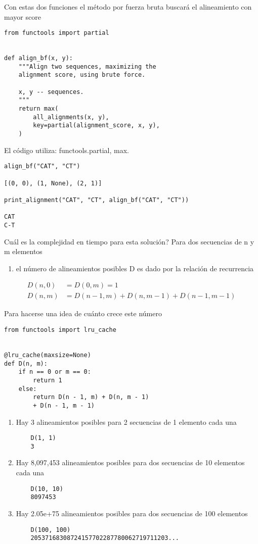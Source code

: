 \documentclass[usenatbib]{tjaa}
\begin{document}
Con estas dos funciones el método por fuerza bruta buscará el alineamiento con mayor score 

\begin{verbatim}
from functools import partial


def align_bf(x, y):
    """Align two sequences, maximizing the
    alignment score, using brute force.

    x, y -- sequences.
    """
    return max(
        all_alignments(x, y),
        key=partial(alignment_score, x, y),
    )
\end{verbatim}

El código utiliza: functools.partial, max.

\begin{verbatim}
align_bf("CAT", "CT")

[(0, 0), (1, None), (2, 1)]

print_alignment("CAT", "CT", align_bf("CAT", "CT"))

CAT
C-T
\end{verbatim}

Cuál es la complejidad en tiempo para esta solución? Para dos secuencias de n y m elementos

\begin{enumerate}
    \item el número de alineamientos posibles D es dado por la relación de recurrencia
\end{enumerate}

\begin{align*}
    D(n,0) &= D(0,m) = 1\\
    D(n,m) &= D(n-1,m)+D(n,m-1)+D(n-1,m-1)
\end{align*}

Para hacerse una idea de cuánto crece este número

\begin{verbatim}
from functools import lru_cache


@lru_cache(maxsize=None)
def D(n, m):
    if n == 0 or m == 0:
        return 1
    else:
        return D(n - 1, m) + D(n, m - 1) 
        + D(n - 1, m - 1)
\end{verbatim}

\begin{enumerate}
    \item Hay 3 alineamientos posibles para 2 secuencias de 1 elemento cada una \begin{verbatim}
    D(1, 1)
    3
    \end{verbatim}
    \item Hay 8,097,453 alineamientos posibles para dos secuencias de 10 elementos cada una \begin{verbatim}
    D(10, 10)
    8097453
    \end{verbatim}
    \item Hay 2.05e+75 alineamientos posibles para dos secuencias de 100 elementos\begin{verbatim}
    D(100, 100)
    20537168308724157702287780062719711203...
    \end{verbatim}
\end{enumerate}
\end{document}
